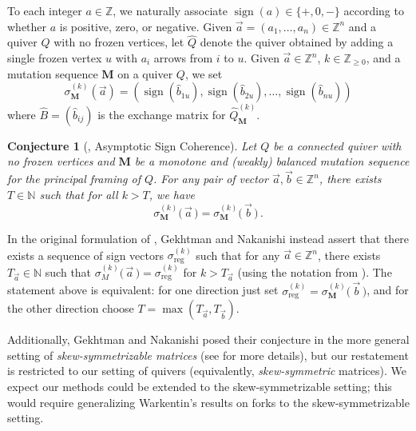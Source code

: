 \documentclass[12pt]{amsart}
\newtheorem{conj}[thm]{Conjecture}
\theoremstyle{definition}
\theoremstyle{remark}
\numberwithin{equation}{section}
\newcommand{\N} { \mathbb{N}}
\newcommand{\Z} { \mathbb{Z}}
\DeclareMathOperator{\sign}{sign}
\begin{document}
To each integer $a \in \Z$, we naturally associate $\sign(a) \in \{+,0,-\}$ according to whether $a$ is positive, zero, or negative.  Given $\vec{a} = (a_1,\dots,a_n) \in \Z^n$ and a quiver $Q$ with no frozen vertices, let $\widehat Q$ denote the quiver obtained by adding a single frozen vertex $u$ with $a_i$ arrows from $i$ to $u$.  Given $\vec{a} \in \Z^n$, $k \in \Z_{\geq 0}$, and a mutation sequence $\mathbf M$ on a quiver $Q$, we set
$$\sigma_{\mathbf M}^{(k)}\left(\vec{a}\right) = \left(\sign\left(\widehat b_{1u}\right), \sign\left(\widehat b_{2u}\right), \dots, \sign\left(\widehat b_{nu}\right) \right)$$
where $\widehat B = (\widehat b_{ij})$ is the exchange matrix for $\widehat Q_{\mathbf M}^{(k)}$.

\begin{conj}[{\cite[Conjecture 2.3]{GekhtmanNakanishi}, Asymptotic Sign Coherence}]\label{conj: asymptotic sign coherence}
Let $Q$ be a connected quiver with no frozen vertices and $\mathbf M$ be a monotone and (weakly) balanced mutation sequence for the principal framing of $Q$.  For any pair of vector $\vec{a}, \vec{b} \in \Z^n$, there exists $T \in \N$ such that for all $k > T$, we have
$$\sigma_{\mathbf M}^{(k)}\big(\,\vec{a}\,\big) = \sigma_{\mathbf M}^{(k)}\big(\,\vec{b}\,\big)\,.$$    
\end{conj}


    In the original formulation of , Gekhtman and Nakanishi instead assert that there exists a sequence of sign vectors $\sigma_{\text{reg}}^{(k)}$ such that for any $\vec{a} \in \Z^{n}$, there exists $T_{\vec{a}} \in \N$ such that $\sigma_{M}^{(k)}\big(\,\vec{a}\,\big)  = \sigma_{\text{reg}}^{(k)}$ for $k > T_{\vec{a}}$ (using the notation from \cite[Conjecture 2.3]{GekhtmanNakanishi}).  The statement above is equivalent: for one direction just set $\sigma_{\text{reg}}^{(k)} = \sigma_{\mathbf M}^{(k)}\big(\,\vec{b}\,\big) $, and for the other direction choose $T = \max(T_{\vec{a}}, T_{\vec{b}})$.
    
    Additionally, Gekhtman and Nakanishi posed their conjecture in the more general setting of \emph{skew-symmetrizable matrices} (see \cite[Section 2]{GekhtmanNakanishi} for more details), but our restatement is restricted to our setting of quivers (equivalently, \emph{skew-symmetric} matrices).  We expect our methods could be extended to the skew-symmetrizable setting; this would require generalizing Warkentin's results on forks \cite{Warkentin} to the skew-symmetrizable setting.
\end{document}

